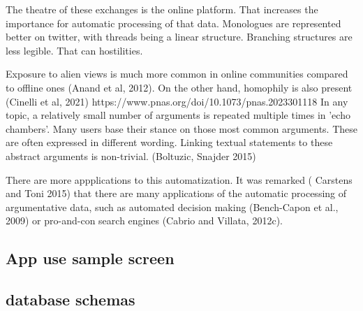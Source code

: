 

The theatre of these exchanges is the online platform.
That increases the importance for automatic processing of that data.
Monologues are represented better on twitter, with threads being a linear structure. Branching structures are less legible.
That can hostilities.

Exposure to alien views is much more common in online communities compared to offline ones (Anand et al, 2012).
On the other hand, homophily is also present (Cinelli et al, 2021) https://www.pnas.org/doi/10.1073/pnas.2023301118
In any topic, a relatively small number of arguments is repeated multiple times in 'echo chambers'.
Many users base their stance on those most common arguments. These are often expressed in different wording.
Linking textual statements to these abstract arguments is non-trivial. (Boltuzic, Snajder 2015)

There are more appplications to this automatization.
It was remarked ( Carstens and Toni 2015) that there are many applications of the automatic processing of argumentative data,
 such as automated decision making (Bench-Capon et al., 2009) or pro-and-con search engines (Cabrio and Villata, 2012c).



\subsection{App use sample screen}

\subsection{database schemas}

